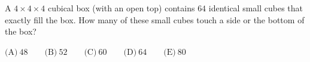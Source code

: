 A $4\times4\times4$ cubical box (with an open top) contains $64$ identical small cubes that exactly fill the box. How many of these small cubes touch a side or the bottom of the box?

$\text{(A)}\ 48\qquad\text{(B)}\ 52\qquad\text{(C)}\ 60\qquad\text{(D)}\ 64\qquad\text{(E)}\ 80$
